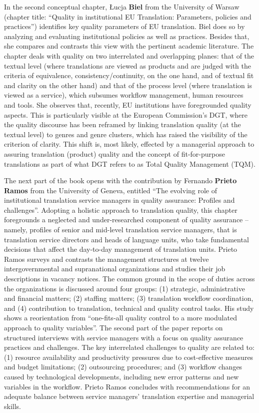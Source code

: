 \documentclass[output=paper]{langsci/langscibook}
\begin{document}
In the second conceptual chapter, Łucja \textbf{Biel} from the University of Warsaw (chapter title: “Quality in institutional EU Translation: Parameters, policies and practices”) identifies key quality parameters of EU translation. Biel does so by analyzing and evaluating institutional policies as well as practices. Besides that, she compares and contrasts this view with the pertinent academic literature. The chapter deals with quality on two interrelated and overlapping planes: that of the textual level (where translations are viewed as products and are judged with the criteria of equivalence, consistency/continuity, on the one hand, and of textual fit and clarity on the other hand) and that of the process level (where translation is viewed as a service), which subsumes workflow management, human resources and tools. She observes that, recently, EU institutions have foregrounded quality aspects. This is particularly visible at the European Commission’s DGT, where the quality discourse has been reframed by linking translation quality (at the textual level) to genres and genre clusters, which has raised the visibility of the criterion of clarity. This shift is, most likely, effected by a managerial approach to assuring translation (product) quality and the concept of fit-for-purpose translations as part of what DGT refers to as Total Quality Management (TQM). 

The next part of the book opens with the contribution by Fernando \textbf{Prieto Ramos} from the University of Geneva, entitled “The evolving role of institutional translation service managers in quality assurance: Profiles and challenges”. Adopting a holistic approach to translation quality, this chapter foregrounds a neglected and under-researched component of quality assurance – namely, profiles of senior and mid-level translation service managers, that is translation service directors and heads of language units, who take fundamental decisions that affect the day-to-day management of translation units. Prieto Ramos surveys and contrasts the management structures at twelve intergovernmental and supranational organizations and studies their job descriptions in vacancy notices. The common ground in the scope of duties across the organizations is discussed around four groups: (1) strategic, administrative and financial matters; (2) staffing matters; (3) translation workflow coordination, and (4) contribution to translation, technical and quality control tasks. His study shows a reorientation from “one-fits-all quality control to a more modulated approach to quality variables”. The second part of the paper reports on structured interviews with service managers with a focus on quality assurance practices and challenges. The key interrelated challenges to quality are related to: (1) resource availability and productivity pressures due to cost-effective measures and budget limitations; (2) outsourcing procedures; and (3) workflow changes caused by technological developments, including new error patterns and new variables in the workflow. Prieto Ramos concludes with recommendations for an adequate balance between service managers’ translation expertise and managerial skills.
\end{document}
